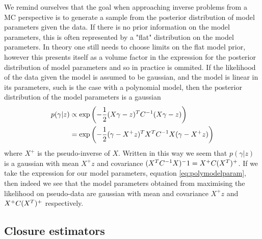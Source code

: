 We remind ourselves that the goal when approaching inverse problems from a
MC perspective is to generate a sample from the posterior
distribution of model parameters given the data. If there is no prior information
on the model parameters, this is often represented by a "flat" distribution
on the model parameters. In theory one still needs to choose limits on the flat
model prior, however this presents itself as a volume factor in the expression
for the posterior distribution of model parameters and so in practice is ommited.
If the likelihood of the data given the model is assumed to be gaussian, and
the model is linear in its parameters, such is the case with a polynomial model,
then the posterior distribution of the model parameters is a gaussian
\begin{equation}
    \begin{split}
        p(\gamma \vert z) &\propto \exp \left( - \frac{1}{2} (X \gamma - z)^T C^{-1}_{} (X \gamma - z)\right) \\
        &=\exp \left( - \frac{1}{2} (\gamma - X^+ z)^T X^T C^{-1}_{} X (\gamma - X^+ z)\right)
    \end{split}
\end{equation}
where $X^+$ is the pseudo-inverse of $X$. Written in this way we seem that
$p(\gamma \vert z)$ is a gaussian with mean $X^+ z$ and covariance
$(X^T C^{-1}_{} X)^-1 = X^+ C (X^T)^+$. If we take the expression for our
model parameters, equation \eqref{eq:polymodelparam}, then indeed we see that
the model parameters obtained from maximising the likelihood on pseudo-data are
gaussian with mean and covariance $X^+ z$ and $X^+ C (X^T)^+$ respectively.

\subsection{Closure estimators}

